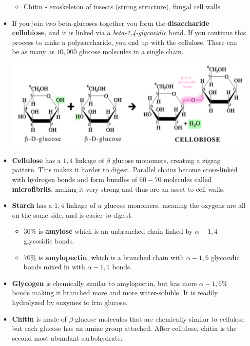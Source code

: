 \documentclass[letterpaper]{article}
\numberwithin{equation}{section}
\theoremstyle{classic}
\begin{document}
\begin{itemize}
\begin{idea}
\begin{itemize}
            \item Chitin - exoskeleton of insects (strong structure), fungal cell walls
        \end{itemize}
    \end{idea}
    \item If you join two beta-glucoses together you form the \textbf{disaccharide cellobiose}, and it is linked via a \textit{beta-1,4-glycosidic} bond. If you continue this process to make a polysaccharide, you end up with the cellulose. There can be as many as $10,000$ glucose molecules in a single chain.
    \begin{center}\includegraphics[width=0.8\linewidth]{A3.PNG}\end{center}
    \item \textbf{Cellulose} has a $1,4$ linkage of $\beta$ glucose monomers, creating a zigzag pattern. This makes it harder to digest. Parallel chains become cross-linked with hydrogen bonds and form bundles of $60-70$ molecules called \textbf{microfibrils}, making it very strong and thus are an asset to cell walls.
    \item \textbf{Starch} has a $1,4$ linkage of $\alpha$ glucose monomers, meaning the oxygens are all on the same side, and is easier to digest.
    \begin{itemize}
        \item $30\%$ is \textbf{amylose} which is an unbranched chain linked by $\alpha-1,4$ glycosidic bonds.
        \item $70\%$ is \textbf{amylopectin}, which is a branched chain with $\alpha-1,6$ glycosidic bonds mixed in with $\alpha-1,4$ bonds.
    \end{itemize}
    \item \textbf{Glycogen} is chemically similar to amylopectin, but has more $\alpha-1,6\%$ bonds making it branched more and more water-soluble. It is readily hydrolyzed by enzymes to frm glucose.
    \item \textbf{Chitin} is made of $\beta$-glucose molecules that are chemically similar to cellulose but each glucose has an amine group attached. After cellulose, chitin is the second most abundant carbohydrate.

\end{itemize}
\end{document}
